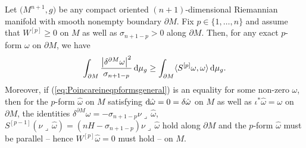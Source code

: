 \begin{Theorem}\label{t:Poincareineqpformsgeneral}
Let $\bigl(M^{n+1},g\bigr)$ be any compact oriented  $(n+1)$-dimensional Riemannian manifold with smooth nonempty boundary $\partial M$.
Fix $p\in\{1,\dots,n\}$ and assume that $W^{[p]}\geq0$ on $M$ as well as $\sigma_{n+1-p}>0$ along $\partial M$.
Then, for any exact $p$-form $\omega$ on $\partial M$,  we have
\begin{equation}\label{eq:Poincareineqpformsgeneral}
\int_{\partial M}\frac{\bigl|\delta^{\partial M}\omega\bigr|^2}{\sigma_{n+1-p}}\,{\rm d}\mu_g\geq\int_{\partial M}\langle S^{[p]}\omega,\omega\rangle\,{\rm d}\mu_g.
\end{equation}
Moreover, if {\rm (\ref{eq:Poincareineqpformsgeneral})} is an equality for some non-zero $\omega$, then for the $p$-form $\hat{\omega}$ on $M$ satisfying ${\rm d}\hat{\omega}=0=\delta\hat{\omega}$ on $M$ as well as $\iota^*\hat{\omega}=\omega$ on $\partial M$, the identities $\delta^{\partial M}\omega=-\sigma_{n+1-p}\nu\lrcorner\,\hat{\omega}$, $S^{[p-1]}(\nu\lrcorner\,\hat{\omega})=(nH-\sigma_{n+1-p})\nu\lrcorner\,\hat{\omega}$ hold along $\partial M$ and the $p$-form $\hat{\omega}$ must be parallel -- hence $W^{[p]}\hat{\omega}=0$ must hold -- on $M$.
\end{Theorem}

